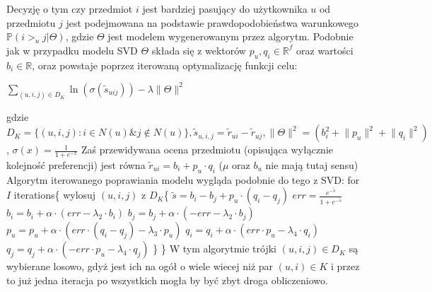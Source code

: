 \documentclass{pracamgr}
\begin{document}
    Decyzję o tym czy przedmiot $i$ jest bardziej pasujący do użytkownika $u$ od przedmiotu $j$ jest podejmowana na podstawie prawdopodobieństwa warunkowego
    $\mathbb{P}(i>_u j|\Theta)$, gdzie $\Theta$ jest modelem wygenerowanym przez algorytm.
    Podobnie jak w przypadku modelu SVD $\Theta$ składa się z wektorów
    $p_u,q_i\in\mathbb{R}^f$ oraz wartości $b_i\in\mathbb{R}$, oraz powstaje poprzez iterowaną
    optymalizację funkcji celu:
    \begin{center}
     $\sum\limits_{(u,i,j)\in D_K}\ln{(\sigma(\tilde{s}_{uij}))}-\lambda\lVert\Theta\rVert^2$
    \end{center}
    gdzie $D_K=\{(u,i,j):i\in N(u) \& j\notin N(u)\}, \tilde{s}_{u,i,j}=\tilde{r}_{ui}-\tilde{r}_{uj}, \lVert\Theta\rVert^2=(b_i^2+\lVert p_u\rVert^2+\lVert q_i\rVert^2)$,
    $\sigma(x)=\frac{1}{1+e^{-x}}$\newline
    Zaś przewidywana ocena przedmiotu (opisująca wyłącznie kolejność preferencji) jest równa $\tilde{r}_{ui}=b_i+p_u\cdot q_i$
    ($\mu$ oraz $b_u$ nie mają tutaj sensu)\newline
    Algorytm iterowanego poprawiania modelu wygląda podobnie do tego z SVD:\newline\newline
    \hspace*{16pt}	for $I$ iterations\{\newline
    \hspace*{32pt}		wylosuj $(u,i,j)$ z $D_K$\{\newline   
    \hspace*{48pt}			$\tilde{s}=b_i-b_j+p_u\cdot(q_i-q_j)$\newline
    \hspace*{48pt}			$err=\frac{e^{-\tilde{s}}}{1+e^{-\tilde{s}}}$\newline
    \hspace*{48pt}			$b_i=b_i+\alpha\cdot(err-\lambda_2\cdot b_i)$\newline
    \hspace*{48pt}			$b_j=b_j+\alpha\cdot(-err-\lambda_2\cdot b_j)$\newline
    \hspace*{48pt}			$p_u=p_u+\alpha\cdot(err\cdot (q_i-q_j)-\lambda_3\cdot p_u)$\newline
    \hspace*{48pt}			$q_i=q_i+\alpha\cdot(err\cdot p_u-\lambda_4\cdot q_i)$\newline
    \hspace*{48pt}			$q_j=q_j+\alpha\cdot(-err\cdot p_u-\lambda_4\cdot q_j)$\newline
    \hspace*{32pt}		\}\newline
    \hspace*{16pt}	\}\newline
    W tym algorytmie trójki $(u,i,j)\in D_K$ są wybierane losowo, gdyż jest ich na ogół o wiele wiecej niż par $(u,i)\in K$
    i przez to już jedna iteracja po wszystkich mogła by być zbyt droga obliczeniowo.
   
\end{document}
